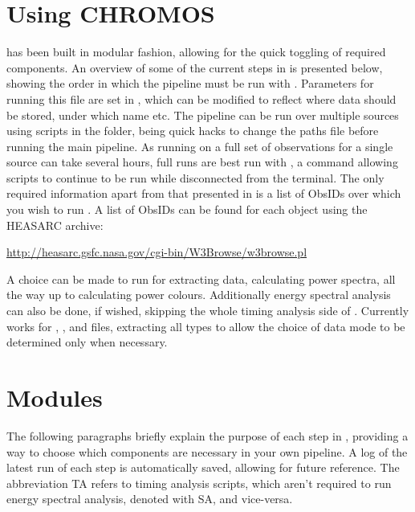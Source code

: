 \clearpage
\section*{Using CHROMOS}
\chromos has been built in modular fashion, allowing for the quick toggling of required components. An overview of some of the current steps in \chromos is presented below, showing the order in which the pipeline must be run with . Parameters for running this file are set in , which can be modified to reflect where data should be stored, under which name etc. The pipeline can be run over multiple sources using scripts in the  folder, being quick hacks to change the paths file before running the main pipeline. As running \chromos on a full set of observations for a single source can take several hours, full \chromos runs are best run with , a command allowing scripts to continue to be run while disconnected from the terminal. The only required information apart from that presented in  is a list of ObsIDs over which you wish to run \chromos. A list of ObsIDs can be found for each object using the \ac{HEASARC} archive:
\begin{center}
	\href{http://heasarc.gsfc.nasa.gov/cgi-bin/W3Browse/w3browse.pl}{http://heasarc.gsfc.nasa.gov/cgi-bin/W3Browse/w3browse.pl}
\end{center}
A choice can be made to run \chromos for extracting data, calculating power spectra, all the way up to calculating power colours. Additionally energy spectral analysis can also be done, if wished, skipping the whole timing analysis side of \chromos. Currently \chromos works for , ,  and  files, extracting all types to allow the choice of data mode to be determined only when necessary.

\section*{Modules}
The following paragraphs briefly explain the purpose of each step in \chromos, providing a way to choose which components are necessary in your own pipeline. A log of the latest run of each step is automatically saved, allowing for future reference. The abbreviation TA refers to timing analysis scripts, which aren't required to run energy spectral analysis, denoted with SA, and vice-versa. 


